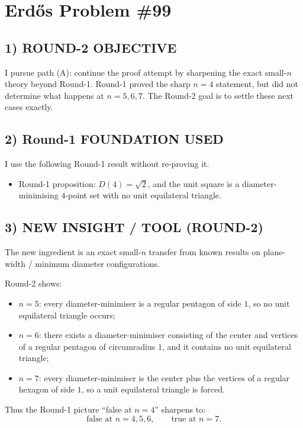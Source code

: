 \section{Erd\H{o}s Problem \#99}

\subsection*{1) ROUND-2 OBJECTIVE}

I pursue path (A): continue the proof attempt by sharpening the exact small-$n$ theory beyond Round-1. Round-1 proved the sharp $n=4$ statement, but did not determine what happens at $n=5,6,7$. The Round-2 goal is to settle these next cases exactly.

\subsection*{2) Round-1 FOUNDATION USED}

I use the following Round-1 result without re-proving it.

\begin{itemize}
\item Round-1 proposition: $D(4)=\sqrt2$, and the unit square is a diameter-minimising $4$-point set with no unit equilateral triangle.
\end{itemize}

\subsection*{3) NEW INSIGHT / TOOL (ROUND-2)}

The new ingredient is an exact small-$n$ transfer from known results on plane-width / minimum diameter configurations.

Round-2 shows:

\begin{itemize}
\item $n=5$: every diameter-minimiser is a regular pentagon of side $1$, so no unit equilateral triangle occurs;
\item $n=6$: there exists a diameter-minimiser consisting of the center and vertices of a regular pentagon of circumradius $1$, and it contains no unit equilateral triangle;
\item $n=7$: every diameter-minimiser is the center plus the vertices of a regular hexagon of side $1$, so a unit equilateral triangle is forced.
\end{itemize}

Thus the Round-1 picture ``false at $n=4$'' sharpens to:
\[
\text{false at }n=4,5,6,\qquad \text{true at }n=7.
\]

